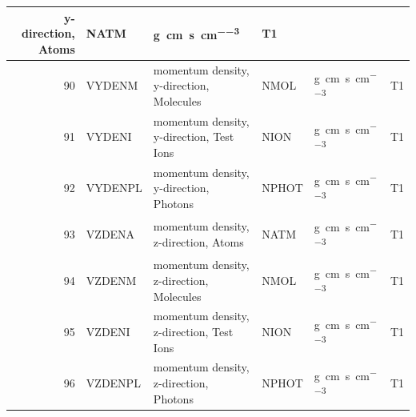 \begin{landscape}
\begin{longtable}{|r|l|l|l|l|c|}
    y-direction, Atoms                                             & NATM                      &
    \si{\gram\centi\metre\per\second\per\cubic\centi\metre}        & T1
    \\ \hline
    90                                                             & VYDENM
                                                                   & momentum density,
    y-direction, Molecules                                         & NMOL                      &
    \si{\gram\centi\metre\per\second\per\cubic\centi\metre}        & T1
    \\ \hline
    91                                                             & VYDENI
                                                                   & momentum density,
    y-direction, Test Ions                                         & NION                      &
    \si{\gram\centi\metre\per\second\per\cubic\centi\metre}        & T1
    \\ \hline
    92                                                             & VYDENPL
                                                                   & momentum density,
    y-direction, Photons                                           & NPHOT                     &
    \si{\gram\centi\metre\per\second\per\cubic\centi\metre}        & T1
    \\ \hline
    93                                                             & VZDENA
                                                                   & momentum density,
    z-direction, Atoms                                             & NATM                      &
    \si{\gram\centi\metre\per\second\per\cubic\centi\metre}        & T1
    \\ \hline
    94                                                             & VZDENM
                                                                   & momentum density,
    z-direction, Molecules                                         & NMOL                      &
    \si{\gram\centi\metre\per\second\per\cubic\centi\metre}        & T1
    \\ \hline
    95                                                             & VZDENI
                                                                   & momentum density,
    z-direction, Test Ions                                         & NION                      &
    \si{\gram\centi\metre\per\second\per\cubic\centi\metre}        & T1
    \\ \hline
    96                                                             & VZDENPL
                                                                   & momentum density,
    z-direction, Photons                                           & NPHOT                     &
    \si{\gram\centi\metre\per\second\per\cubic\centi\metre}        & T1


\end{longtable}
\end{landscape}
